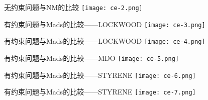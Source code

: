 \documentclass[xcolor=table,dvipsnames,svgnames,aspectratio=169,fontset=windows]{ctexbeamer}
\begin{document}
\begin{frame}{无约束问题与NM的比较}
  \texttt{[image: ce-2.png]}
\end{frame}

\begin{frame}{有约束问题与Mads的比较——LOCKWOOD}
  \texttt{[image: ce-3.png]}
\end{frame}

\begin{frame}{有约束问题与Mads的比较——LOCKWOOD}
  \texttt{[image: ce-4.png]}
\end{frame}

\begin{frame}{有约束问题与Mads的比较——MDO}
  \texttt{[image: ce-5.png]}
\end{frame}

\begin{frame}{有约束问题与Mads的比较——STYRENE}
  \texttt{[image: ce-6.png]}
\end{frame}

\begin{frame}{有约束问题与Mads的比较——STYRENE}
  \texttt{[image: ce-7.png]}
\end{frame}
\makebottom
\end{document}
